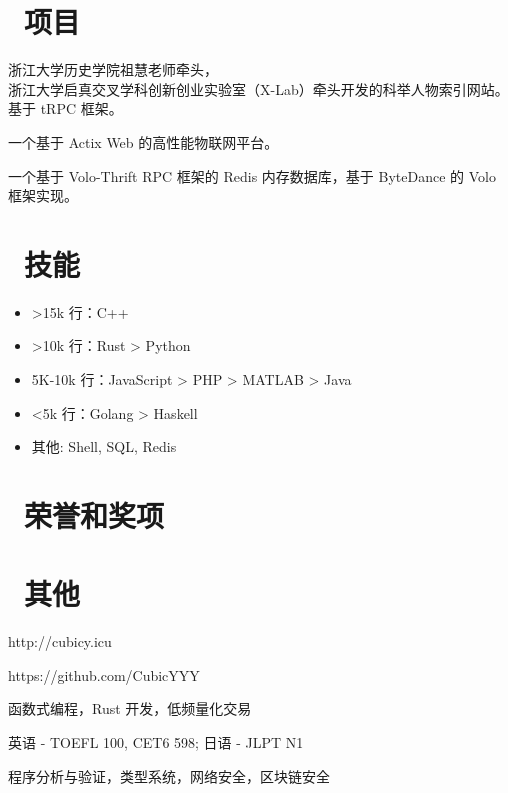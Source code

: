 \documentclass{resume}
\begin{document}
\section{\faFileCodeO\ 项目}
浙江大学历史学院祖慧老师牵头， \\ 
浙江大学启真交叉学科创新创业实验室（X-Lab）牵头开发的科举人物索引网站。\\
基于 tRPC 框架。

一个基于 Actix Web 的高性能物联网平台。

一个基于 Volo-Thrift RPC 框架的 Redis 内存数据库，基于 ByteDance 的 Volo 框架实现。

\section{\faCogs\ 技能}
\begin{itemize}[parsep=0.5ex]
  \item >15k 行：C++
  \item >10k 行：Rust > Python
  \item 5K-10k 行：JavaScript > PHP > MATLAB > Java
  \item <5k 行：Golang > Haskell
  \item 其他: Shell, SQL, Redis
\end{itemize}

\section{\faHeartO\ 荣誉和奖项}


\section{\faInfo\ 其他}
\begin{description}[parsep=0.5ex]
  \item[个人博客] http://cubicy.icu
  \item[GitHub] https://github.com/CubicYYY
  \item[技术兴趣] 函数式编程，Rust 开发，低频量化交易
  \item[语言能力] 英语 - TOEFL 100, CET6 598; 日语 - JLPT N1
  \item[研究兴趣] 程序分析与验证，类型系统，网络安全，区块链安全
\end{description}

%
%
\end{document}
